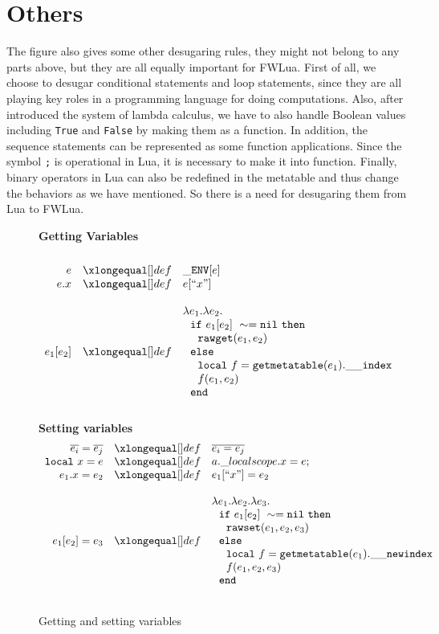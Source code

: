 \section{Others}
The figure also gives some other desugaring rules, they might not belong to any parts above, but they are all equally important for FWLua. First of all, we choose to desugar conditional statements and loop statements, since they are all playing key roles in a programming language for doing computations. Also, after introduced the system of lambda calculus, we have to also handle Boolean values including {\tt True} and {\tt False} by making them as a function. In addition, the sequence statements can be represented as some function applications. Since the symbol {\tt ;} is operational in Lua, it is necessary to make it into function. Finally, binary operators in Lua can also be redefined in the metatable and thus change the behaviors as we have mentioned. So there is a need for desugaring them from Lua to FWLua.
\begin{figure}[P]
\caption{Getting and setting variables}
{\bf Getting Variables}
\label{fig:getandset}
\[
\begin{array}{rclcl}
\\
\desugar{e}{{\tt \_ENV}[e]}
\desugar{e.x}{e[``x"]}
\\
\desugar{
     e_1[e_2]
}{
    {\lambda}e_1.{\lambda}e_2.\\
    ~~{\tt if}~ e_1[e_2] ~\sim= {\tt nil} ~ {\tt then}\\
    ~~~~{\tt rawget}(e_1, e_2) ~\\
    ~~{\tt else}\\
    ~~~~{\tt local}~f = {\tt getmetatable}(e_1).{\tt{\_}{\_}index}~\\
    ~~~~f(e_1,e_2)\\ 
    ~~{\tt end}
}
\\
\end{array}
\]
{\bf Setting variables}
\[
\begin{array}{rclcl}
\desugar{
     \overline{e_i}=\overline{e_j}
}{   
     \overline{e_i = e_j}
}
\desugar{
     {\tt local}~x=e
}{   
  a.\_localscope.x = e;
}
\desugar{e_1.x=e_2}{e_1[``x"] = e_2}
\\
\desugar{
     e_1[e_2]=e_3
}{
    {\lambda}e_1.{\lambda}e_2.{\lambda}e_3.\\
    ~~{\tt if}~ e_1[e_2] ~\sim= {\tt nil} ~ {\tt then}\\
    ~~~~{\tt rawset}(e_1, e_2,e_3) ~\\
    ~~{\tt else}\\
    ~~~~{\tt local}~f = {\tt getmetatable}(e_1).{\tt{\_}{\_}newindex}~\\
    ~~~~f(e_1,e_2,e_3)\\ 
    ~~{\tt end}
}
\\
\end{array}
\]
\end{figure}

